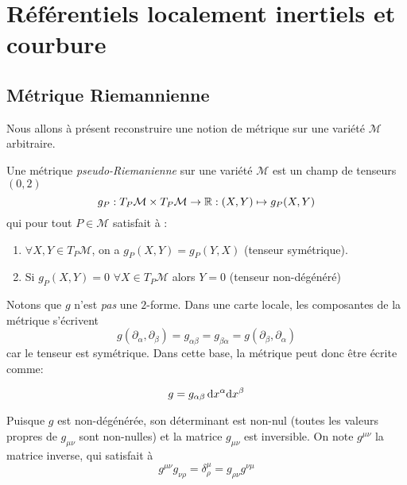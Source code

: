 \chapter{Référentiels localement inertiels et courbure}
\section{Métrique Riemannienne}
Nous allons à présent reconstruire une notion de métrique sur une variété $\mathcal{M}$ arbitraire. 

\begin{theoremframe}
    \begin{defi}
        Une métrique \textit{pseudo-Riemanienne} sur une variété $\mathcal{M}$ est un champ de tenseurs $(0, 2)$
        \begin{equation}
            g_P:T_P\mathcal{M} \times T_P\mathcal{M} \to \mathbb{R}: (X,Y) \mapsto g_P(X,Y)
        \end{equation}
        qui pour tout $P \in \mathcal{M}$ satisfait à :
        \begin{enumerate}
            \item $\forall X, Y \in T_P \mathcal{M}$, on a $g_P(X, Y) = g_P(Y, X)$ (tenseur symétrique).
            \item Si $g_P(X, Y) = 0$ $\forall X \in T_P \mathcal{M}$ alors $Y = 0$ (tenseur non-dégénéré)
        \end{enumerate}
    \end{defi}
\end{theoremframe}
Notons que $g$ n'est \emph{pas} une $2$-forme. Dans une carte locale, les composantes de la métrique s'écrivent
\begin{equation}
g(\partial_{\alpha}, \partial_{\beta}) = g_{\alpha \beta} = g_{\beta \alpha} = g(\partial_{\beta}, \partial_{\alpha})
\end{equation}
car le tenseur est symétrique. Dans cette base, la métrique peut donc être écrite comme:

 \begin{equation}
     g = g_{\alpha \beta}\, \mathrm{d} x^{\alpha}\mathrm{d} x^{\beta}
 \end{equation}

 Puisque $g$ est non-dégénérée, son déterminant est non-nul (toutes les valeurs propres de $g_{\mu \nu}$ sont non-nulles) et la matrice $g_{\mu \nu}$ est inversible. On note $g^{\mu \nu}$ la matrice inverse, qui satisfait à
 \begin{equation}
     \boxed{g^{\mu \nu}g_{\nu \rho} = \delta^{\mu}
     _{\rho} = g_{\rho \nu}g^{\nu \mu}}
 \end{equation}

